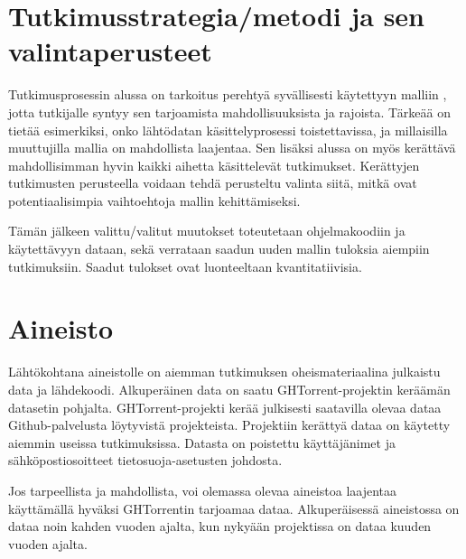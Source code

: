 \documentclass[utf8]{gradu3}
\begin{document}
\chapter{Tutkimusstrategia/metodi ja sen valintaperusteet}
Tutkimusprosessin alussa on tarkoitus perehtyä syvällisesti käytettyyn malliin
\parencite{riivo-2016}, jotta tutkijalle syntyy sen tarjoamista
mahdollisuuksista ja rajoista. Tärkeää on tietää esimerkiksi, onko lähtödatan
käsittelyprosessi toistettavissa, ja millaisilla muuttujilla mallia on
mahdollista laajentaa. Sen lisäksi alussa on myös kerättävä mahdollisimman hyvin
kaikki aihetta käsittelevät tutkimukset. Kerättyjen tutkimusten perusteella
voidaan tehdä perusteltu valinta siitä, mitkä ovat potentiaalisimpia
vaihtoehtoja mallin kehittämiseksi.

Tämän jälkeen valittu/valitut muutokset toteutetaan ohjelmakoodiin ja
käytettävyyn dataan, sekä verrataan saadun uuden mallin tuloksia aiempiin
tutkimuksiin. Saadut tulokset ovat luonteeltaan kvantitatiivisia.

\chapter{Aineisto}
Lähtökohtana aineistolle on aiemman tutkimuksen \parencite{riivo-2016}
oheismateriaalina julkaistu data ja lähdekoodi. Alkuperäinen data on saatu
GHTorrent-projektin \parencite{Gousi13} keräämän datasetin pohjalta.
GHTorrent-projekti kerää julkisesti saatavilla olevaa dataa Github-palvelusta
löytyvistä projekteista. Projektiin kerättyä dataa on käytetty aiemmin useissa
tutkimuksissa. Datasta on poistettu käyttäjänimet ja sähköpostiosoitteet
tietosuoja-asetusten johdosta.

Jos tarpeellista ja mahdollista, voi olemassa olevaa aineistoa laajentaa
käyttämällä hyväksi GHTorrentin tarjoamaa dataa. Alkuperäisessä aineistossa on
dataa noin kahden vuoden ajalta, kun nykyään projektissa on dataa kuuden vuoden
ajalta.
\end{document}

